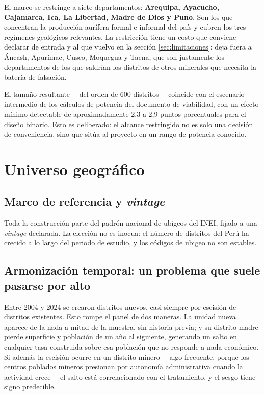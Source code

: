 \documentclass[11pt,a4paper]{article}
\begin{document}
El marco se restringe a siete departamentos: \textbf{Arequipa, Ayacucho, Cajamarca, Ica, La Libertad, Madre de Dios y Puno}. Son los que concentran la producción aurífera formal e informal del país y cubren los tres regímenes geológicos relevantes. La restricción tiene un costo que conviene declarar de entrada y al que vuelvo en la sección \ref{sec:limitaciones}: deja fuera a Áncash, Apurímac, Cusco, Moquegua y Tacna, que son justamente los departamentos de los que saldrían los distritos de otros minerales que necesita la batería de falsación.

El tamaño resultante ---del orden de 600 distritos--- coincide con el escenario intermedio de los cálculos de potencia del documento de viabilidad, con un efecto mínimo detectable de aproximadamente 2{,}3 a 2{,}9 puntos porcentuales para el diseño binario. Esto es deliberado: el alcance restringido no es solo una decisión de conveniencia, sino que sitúa al proyecto en un rango de potencia conocido.

\section{Universo geográfico}

\subsection{Marco de referencia y \emph{vintage}}

Toda la construcción parte del padrón nacional de ubigeos del INEI, fijado a una \emph{vintage} declarada. La elección no es inocua: el número de distritos del Perú ha crecido a lo largo del periodo de estudio, y los códigos de ubigeo no son estables.

\subsection{Armonización temporal: un problema que suele pasarse por alto}

Entre 2004 y 2024 se crearon distritos nuevos, casi siempre por escisión de distritos existentes. Esto rompe el panel de dos maneras. La unidad nueva aparece de la nada a mitad de la muestra, sin historia previa; y su distrito madre pierde superficie y población de un año al siguiente, generando un salto en cualquier tasa construida sobre esa población que no responde a nada económico. Si además la escisión ocurre en un distrito minero ---algo frecuente, porque los centros poblados mineros presionan por autonomía administrativa cuando la actividad crece--- el salto está correlacionado con el tratamiento, y el sesgo tiene signo predecible.
\end{document}
